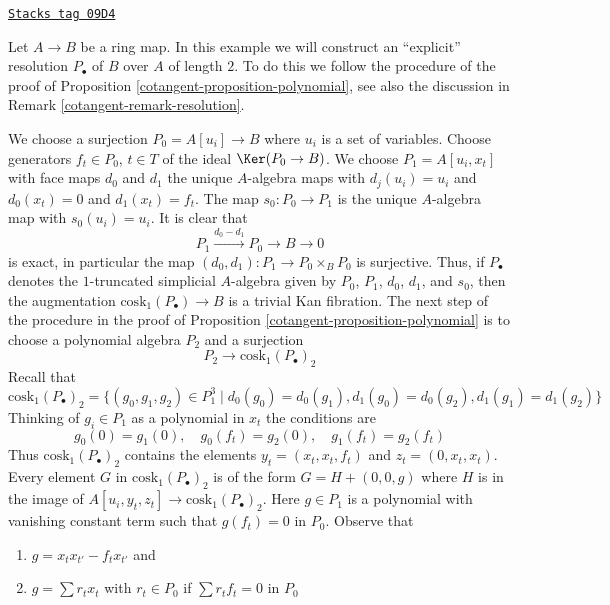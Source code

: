 \begin{example}
\label{cotangent-example-resolution-length-two}
\href{https://stacks.math.columbia.edu/tag/09D4}{\texttt{Stacks tag 09D4}}

Let $A \to B$ be a ring map. In this example we
will construct an ``explicit'' resolution $P_\bullet$ of $B$ over $A$ of
length $2$. To do this we follow the procedure of the proof of
Proposition \ref{cotangent-proposition-polynomial}, see also the discussion in
Remark \ref{cotangent-remark-resolution}.

\medskip\noindent
We choose a surjection $P_0 = A[u_i] \to B$ where $u_i$ is a set of
variables. Choose generators $f_t \in P_0$, $t \in T$ of the ideal
$\Ker(P_0 \to B)$. We choose $P_1 = A[u_i, x_t]$ with face maps
$d_0$ and $d_1$ the unique $A$-algebra maps with $d_j(u_i) = u_i$
and $d_0(x_t) = 0$ and $d_1(x_t) = f_t$. The map $s_0 : P_0 \to P_1$
is the unique $A$-algebra map with $s_0(u_i) = u_i$. It is clear that
$$
P_1 \xrightarrow{d_0 - d_1} P_0 \to B \to 0
$$
is exact, in particular the map $(d_0, d_1) : P_1 \to P_0 \times_B P_0$
is surjective. Thus, if $P_\bullet$ denotes the $1$-truncated
simplicial $A$-algebra given by $P_0$, $P_1$, $d_0$, $d_1$, and $s_0$, then
the augmentation $\text{cosk}_1(P_\bullet) \to B$ is a trivial Kan fibration.
The next step of the procedure in the proof of
Proposition \ref{cotangent-proposition-polynomial}
is to choose a polynomial algebra $P_2$ and a surjection
$$
P_2 \longrightarrow \text{cosk}_1(P_\bullet)_2
$$
Recall that
$$
\text{cosk}_1(P_\bullet)_2 =
\{(g_0, g_1, g_2) \in P_1^3 \mid d_0(g_0) = d_0(g_1),
d_1(g_0) = d_0(g_2), d_1(g_1) = d_1(g_2)\}
$$
Thinking of $g_i \in P_1$ as a polynomial in $x_t$ the conditions
are
$$
g_0(0) = g_1(0),\quad
g_0(f_t) = g_2(0),\quad
g_1(f_t) = g_2(f_t)
$$
Thus $\text{cosk}_1(P_\bullet)_2$ contains the elements
$y_t = (x_t, x_t, f_t)$ and $z_t = (0, x_t, x_t)$.
Every element $G$ in $\text{cosk}_1(P_\bullet)_2$ is
of the form $G = H + (0, 0, g)$ where $H$ is in the image
of $A[u_i, y_t, z_t] \to \text{cosk}_1(P_\bullet)_2$. Here
$g \in P_1$ is a polynomial with vanishing
constant term such that $g(f_t) = 0$ in $P_0$. Observe that
\begin{enumerate}
\item $g = x_t x_{t'} - f_t x_{t'}$ and
\item $g = \sum r_t x_t$ with $r_t \in P_0$ if $\sum r_t f_t = 0$ in $P_0$
\end{enumerate}

\end{example}
